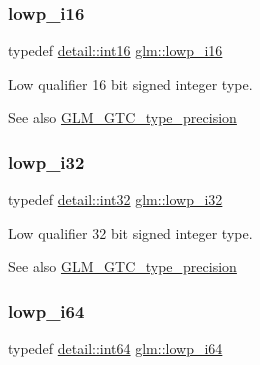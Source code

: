 \subsubsection{\texorpdfstring{lowp\+\_\+i16}{lowp\_i16}}
{\footnotesize\ttfamily typedef \mbox{\hyperlink{namespaceglm_1_1detail_a375938874ca4f0a0982ec6373b56117b}{detail\+::int16}} \mbox{\hyperlink{group__gtc__type__precision_gaf7bbfd31bcec25a416ea94d09efb5451}{glm\+::lowp\+\_\+i16}}}

Low qualifier 16 bit signed integer type. \begin{DoxySeeAlso}{See also}
\mbox{\hyperlink{group__gtc__type__precision}{G\+L\+M\+\_\+\+G\+T\+C\+\_\+type\+\_\+precision}} 
\end{DoxySeeAlso}
\mbox{\label{group__gtc__type__precision_ga70fd34e8b8cffc92739161284ed77328}} 
\subsubsection{\texorpdfstring{lowp\+\_\+i32}{lowp\_i32}}
{\footnotesize\ttfamily typedef \mbox{\hyperlink{namespaceglm_1_1detail_a9f85b4efeca416cdcec2fd08939a2e17}{detail\+::int32}} \mbox{\hyperlink{group__gtc__type__precision_ga70fd34e8b8cffc92739161284ed77328}{glm\+::lowp\+\_\+i32}}}

Low qualifier 32 bit signed integer type. \begin{DoxySeeAlso}{See also}
\mbox{\hyperlink{group__gtc__type__precision}{G\+L\+M\+\_\+\+G\+T\+C\+\_\+type\+\_\+precision}} 
\end{DoxySeeAlso}
\mbox{\label{group__gtc__type__precision_ga1f4ded25f71c0f3b4518936d50b54b6e}} 
\subsubsection{\texorpdfstring{lowp\+\_\+i64}{lowp\_i64}}
{\footnotesize\ttfamily typedef \mbox{\hyperlink{namespaceglm_1_1detail_a5b1c3227ec636c24a0676746381adfc8}{detail\+::int64}} \mbox{\hyperlink{group__gtc__type__precision_ga1f4ded25f71c0f3b4518936d50b54b6e}{glm\+::lowp\+\_\+i64}}}

